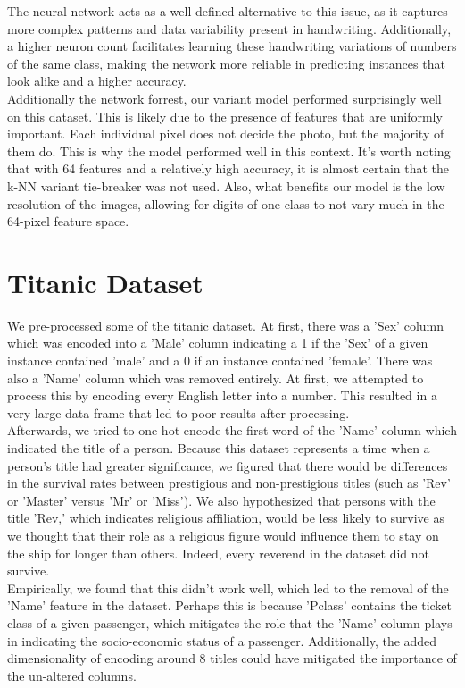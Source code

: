 \documentclass{article}
\begin{document}
The neural network acts as a well-defined alternative to this issue, as it captures more complex patterns and data variability present in handwriting.
Additionally, a higher neuron count facilitates learning these handwriting variations of numbers of the same class, making the network more reliable in predicting instances that look alike and a higher accuracy.
\\

Additionally the network forrest, our variant model performed surprisingly well on this dataset. This is likely due to the presence of features that
are uniformly important. Each individual pixel does not decide the photo, but the majority of them do. This is why the model performed well in this context.
It's worth noting that with 64 features and a relatively high accuracy, it is almost certain that the k-NN variant tie-breaker was not used.
Also, what benefits our model is the low resolution of the images, allowing for digits of one class to not vary much in the 64-pixel feature space.

\newpage
\section*{Titanic Dataset}
We pre-processed some of the titanic dataset. At first, there was a 'Sex' column which was encoded into a 'Male' column indicating a 1 if the 'Sex' of a given instance contained 'male' and a 0 if an instance contained 'female'.
There was also a 'Name' column which was removed entirely. At first, we attempted to process this by encoding every English letter into a number. This resulted in a very large data-frame that led to poor results after processing. 
\\

Afterwards, we tried to one-hot encode the first word of the 'Name' column which indicated the title of a person. Because this dataset represents a time when a person's title had greater significance, we figured that there would be differences in the survival rates between prestigious and non-prestigious titles (such as 'Rev' or 'Master' versus 'Mr' or 'Miss').
We also hypothesized that persons with the title 'Rev,' which indicates religious affiliation, would be less likely to survive as we thought that their role as a religious figure would influence them to stay on the ship for longer than others. Indeed, every reverend in the dataset did not survive.
\\

Empirically, we found that this didn't work well, which led to the removal of the 'Name' feature in the dataset.
Perhaps this is because 'Pclass' contains the ticket class of a given passenger, which mitigates the role that the 'Name' column plays in indicating the socio-economic status of a passenger. Additionally,
the added dimensionality of encoding around 8 titles could have mitigated the importance of the un-altered columns.
\\
\end{document}
